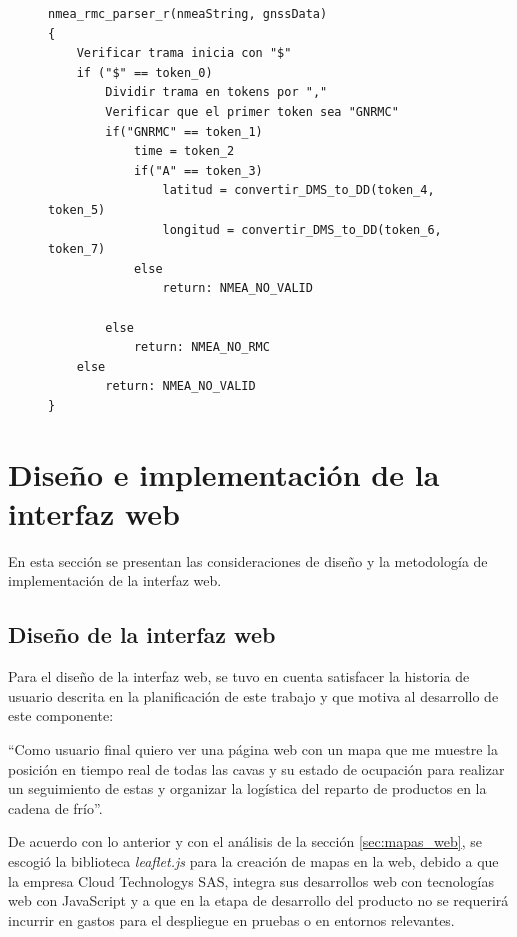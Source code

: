 \begin{figure}[H]
\begin{lstlisting}
nmea_rmc_parser_r(nmeaString, gnssData)
{
	Verificar trama inicia con "$"
	if ("$" == token_0)
		Dividir trama en tokens por ","
		Verificar que el primer token sea "GNRMC"
		if("GNRMC" == token_1)
			time = token_2 
			if("A" == token_3)
				latitud = convertir_DMS_to_DD(token_4, token_5)
				longitud = convertir_DMS_to_DD(token_6, token_7)
			else
				return: NMEA_NO_VALID			
			 
		else
			return: NMEA_NO_RMC
	else
		return: NMEA_NO_VALID
}

\end{lstlisting}
\label{cod:nmea_rmc_parser_r}
\end{figure}



\section{Diseño e implementación de la interfaz web}

En esta sección se presentan las consideraciones de diseño y la metodología de implementación de la interfaz web.

\subsection{Diseño de la interfaz web}

Para el diseño de la interfaz web, se tuvo en cuenta satisfacer la historia de usuario descrita en la planificación de este trabajo y que motiva al desarrollo de este componente: 

``Como usuario final quiero ver una página web con un mapa que me muestre la posición en tiempo real de todas las cavas y su estado de ocupación para realizar un seguimiento de estas y organizar la logística del reparto de productos en la cadena de frío''.

De acuerdo con lo anterior y con el análisis de la sección \ref{sec:mapas_web}, se escogió la biblioteca \textit{leaflet.js} \citep{leafletjs} para la creación de mapas en la web, debido a que la empresa Cloud Technologys SAS, integra sus desarrollos web con tecnologías web con JavaScript y a que en la etapa de desarrollo del producto no se requerirá incurrir en gastos para el despliegue en pruebas o en entornos relevantes. 

